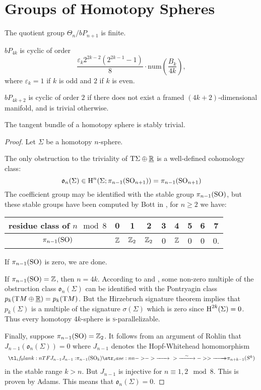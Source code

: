 \chapter{Groups of Homotopy Spheres}

\begin{theorem}
	The quotient group $\Theta_n / bP_{n+1}$ is finite.
\end{theorem}

\begin{theorem}
	$bP_{4k}$ is cyclic of order
	\[
		\frac{\varepsilon_k 2^{2k-2}(2^{2k-1}-1)}{8}\cdot \mathrm{num}\left(\frac{B_k}{4k}\right),
	\]
	where $\varepsilon_k=1$ if $k$ is odd and $2$ if $k$ is even.
\end{theorem}

\begin{theorem}
	$bP_{4k+2}$ is cyclic of order $2$ if there does not exist a framed $(4k+2)$-dimensional manifold, and is trivial otherwise.
\end{theorem}

\begin{theorem}\label{thm:homotopy_spheres_are_s-parallelizable}
  The tangent bundle of a homotopy sphere is stably trivial.
\end{theorem}

\begin{proof}
	Let $\Sigma$ be a homotopy $n$-sphere.

	The only obstruction to the triviality of $\mathrm{T} \Sigma \oplus \underline{\mathbb{R}}$ is a well-defined cohomology class:
	\[
		\mathfrak{o}_n(\Sigma) \in \operatorname{H}^n(\Sigma; \pi_{n-1}({\operatorname{SO}}_{n+1})) = \pi_{n-1}({\operatorname{SO}}_{n+1})
	\]
	The coefficient group may be identified with the stable group $\pi_{n-1}({\operatorname{SO}})$, but these stable groups have been computed by Bott in \cite{bott1957}, for $n\geq 2$ we have:
	\begin{center}
		\begin{tabular}{c|cccccccc}
			\textrm{residue class of $n\mod 8$} & 0 & 1 & 2 & 3 & 4 & 5 & 6 & 7\\
			\hline
			$\pi_{n-1}({\operatorname{SO}})$ & $\mathbb{Z}$ & $\mathbb{Z}_2$ & $\mathbb{Z}_2$ & 0 & $\mathbb{Z}$ & 0 & 0 & 0.
		\end{tabular}
	\end{center}
	If $\pi_{n-1}({\operatorname{SO}})$ is zero, we are done. 

	If $\pi_{n-1}({\operatorname{SO}}) = \mathbb{Z}$, then $n=4k$. According to \cite{kervairemilnor1960} and \cite{kervaire1959}, some non-zero multiple of the obstruction class $\mathfrak{o}_n(\Sigma)$ can be identified with the Pontryagin class $p_k(\mathrm{T} M\oplus \underline{\mathbb{R}}) = p_k(\mathrm{T} M)$.  But the Hirzebruch signature theorem implies  that $p_k(\Sigma)$ is a multiple of the signature $\sigma(\Sigma)$ which is zero since $\operatorname{H}^{2k}(\Sigma)=0$. Thus every homotopy $4k$-sphere is \textsc{s}-parallelizable. 

	Finally, suppose $\pi_{n-1}({\operatorname{SO}})= \mathbb{Z}_2$. It follows from an argument of Rohlin  that $J_{n-1}(\mathfrak{o}_n(\Sigma))=0$ where $J_{n-1}$ denotes the Hopf-Whitehead homomorphism
	\[
		\lkxfunc{J_{n-1}}{\pi_{n-1}(\SO_k)}{\pi_{n+k-1}(S^k)}
	\]
	in the stable range $k >n$. But $J_{n-1}$ is injective for $n\equiv 1, 2\mod 8$. This is proven by Adams.  This means that $\mathfrak{o}_n(\Sigma)=0$.
\end{proof}
